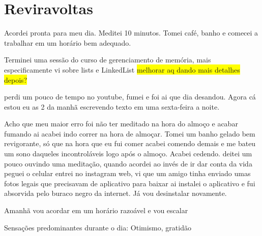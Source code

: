 \chapter{Reviravoltas}\label{capitulo 5}

Acordei pronta para meu dia. Meditei 10 minutos. Tomei café, banho e comecei a trabalhar em um horário bem adequado.

Terminei uma sessão do curso de gerenciamento de memória, mais especificamente vi sobre lists e LinkedList \colorbox{yellow}{melhorar aq dando mais detalhes depois?}

perdi um pouco de tempo no youtube, fumei e foi ai que dia desandou. Agora cá estou eu as 2 da manhã escrevendo texto em uma sexta-feira a noite.

Acho que meu maior erro foi não ter meditado na hora do almoço e acabar fumando ai acabei indo correr na hora de almoçar. Tomei um banho gelado bem revigorante, só que na hora que eu fui comer acabei comendo demais e me bateu um sono daqueles incontroláveis logo após o almoço. Acabei cedendo. deitei um pouco ouvindo uma meditação, quando acordei ao invés de ir dar conta da vida peguei o celular entrei no instagram web, vi que um amigo tinha enviado umas fotos legais que precisavam de aplicativo para baixar ai instalei o aplicativo e fui absorvida pelo buraco negro da internet. Já vou desinstalar novamente.

 Amanhã vou acordar em um horário razoável e vou escalar

Sensações predominantes durante o dia: Otimismo, gratidão

